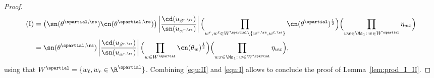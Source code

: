 \documentclass[a4paper,twoside,11pt]{article}
\begin{document}
\begin{proof}
\begin{align}
\mathrm{(I)}&=\bigl(\sn(\theta^{\spartial,\rs})\cn(\theta^{\spartial,\rs})\bigr)\left|\frac{\cd(u_{\beta^{r,\rs}})}{\sn(u_{\alpha^{r,\rs}})}\right|
\Bigl(\prod_{w^r,w^\ell\in W^\spartial\setminus\{w^{r,\rs},w^{\ell,\rs}\}}\cn(\theta^\spartial)^\frac{1}{2}\Bigr)
\Bigl(\prod_{wx\in\Ms_1:\,w\in W^\spartial }\eta_{w x}\Bigr)\nonumber\\
&=\sn(\theta^{\spartial,\rs})\left|\frac{\cd(u_{\beta^{r,\rs}})}{\sn(u_{\alpha^{r,\rs}})}\right|
\Bigl(\prod_{w\in W^\spartial}\cn(\theta_w)^\frac{1}{2}\Bigr)
\Bigl(\prod_{wx\in\Ms_1:\,w\in W^\spartial }\eta_{w x}\Bigr),
\label{equ:I} 
\end{align}
using that $W^\spartial=\{w_\ell,w_r\in \R^\spartial\}$.
Combining \eqref{equ:II} and \eqref{equ:I} allows to conclude the proof of Lemma~\ref{lem:prod_I_II}.
\end{proof}
\end{document}
